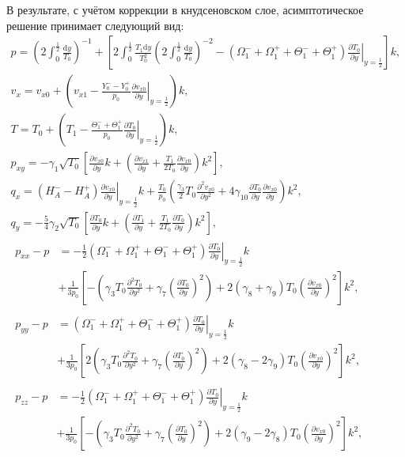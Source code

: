 \documentclass[a4paper,12pt]{article}
\newcommand{\dd}{\mathrm{d}}
\newcommand{\pder}[2][]{\frac{\partial#1}{\partial#2}}
\newcommand{\pderdual}[2][]{\frac{\partial^2#1}{\partial#2^2}}
\begin{document}
В результате, с учётом коррекции в кнудсеновском слое, асимптотическое решение принимает следующий вид:
\begin{gather}
    p = \left( 2\int_{0}^\frac12\frac{\dd{y}}{T_0} \right)^{-1}
        + \left[ 2\int_{0}^\frac12\frac{T_1\dd{y}}{T_0^2} \left(2\int_{0}^\frac12\frac{\dd{y}}{T_0}\right)^{-2}
        - (\Omega_1^-+\Omega_1^+ + \Theta_1^-+\Theta_1^+)\left.\pder[T_0]{y}\right|_{y=\frac12}\right]k, \label{eq:Hilbert_p}\\
    v_x = v_{x0} + \left(v_{x1} - \frac{Y_0^--Y_0^+}{p_0}\left.\pder[v_{x0}]{y}\right|_{y=\frac12}\right)k, \label{eq:Hilbert_U}\\
    T = T_0 + \left(T_1 - \frac{\Theta_1^-+\Theta_1^+}{p_0}\left.\pder[T_0]{y}\right|_{y=\frac12}\right)k, \label{eq:Hilbert_T}\\
    p_{xy} = -\gamma_1\sqrt{T_0}\left[\pder[v_{x0}]{y}k + \left(\pder[v_{x1}]{y} + \frac{T_1}{2T_0}\pder[v_{x0}]{y}\right)k^2 \right], \label{eq:Hilbert_Pxy}\\
    q_x = (H_A^--H_A^+)\left.\pder[v_{x0}]{y}\right|_{y=\frac12}k + \frac{T_0}{p_0}\left(\frac{\gamma_3}2 T_0 \pderdual[v_{x0}]{y}
        + 4\gamma_{10} \pder[T_0]{y}\pder[v_{x0}]{y}\right)k^2, \label{eq:Hilbert_Qx}\\
    q_y = -\frac54\gamma_2\sqrt{T_0}\left[\pder[T_0]{y}k + \left(\pder[T_1]{y} + \frac{T_1}{2T_0}\pder[T_0]{y}\right)k^2 \right], \label{eq:Hilbert_Qy}\\
    \begin{aligned}
    p_{xx} - p &= -\frac12 (\Omega_1^-+\Omega_1^+ + \Theta_1^-+\Theta_1^+)\left.\pder[T_0]{y}\right|_{y=\frac12}k \\
        &+ \frac1{3p_0}\left[-\left(\gamma_3 T_0 \pderdual[T_0]{y} + \gamma_7\left(\pder[T_0]{y}\right)^2\right)
        + 2(\gamma_8+\gamma_9)T_0\left(\pder[v_{x0}]{y}\right)^2\right]k^2,
    \end{aligned}\label{eq:Hilbert_Pxx}\\
    \begin{aligned}
    p_{yy} - p &= (\Omega_1^-+\Omega_1^+ + \Theta_1^-+\Theta_1^+)\left.\pder[T_0]{y}\right|_{y=\frac12}k \\
        &+ \frac1{3p_0}\left[2\left(\gamma_3 T_0 \pderdual[T_0]{y} + \gamma_7\left(\pder[T_0]{y}\right)^2\right)
        + 2(\gamma_8-2\gamma_9)T_0\left(\pder[v_{x0}]{y}\right)^2\right]k^2,
    \end{aligned}\label{eq:Hilbert_Pyy}\\
    \begin{aligned}
    p_{zz} - p &= -\frac12 (\Omega_1^-+\Omega_1^+ + \Theta_1^-+\Theta_1^+)\left.\pder[T_0]{y}\right|_{y=\frac12}k \\
        &+ \frac1{3p_0}\left[-\left(\gamma_3 T_0 \pderdual[T_0]{y} + \gamma_7\left(\pder[T_0]{y}\right)^2\right)
        + 2(\gamma_9-2\gamma_8)T_0\left(\pder[v_{x0}]{y}\right)^2\right]k^2,
    \end{aligned}\label{eq:Hilbert_Pzz}
\end{gather}
\end{document}
